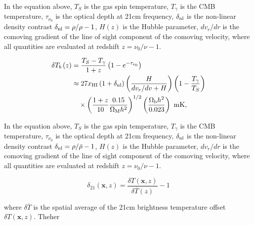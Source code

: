 
In the equation above, $T_S$ is the gas spin temperature, $T_{\gamma}$ is the
CMB temperature, $\tau_{\nu_0}$ is the optical depth at 21cm frequency, $\delta_{\rm nl}$
is the non-linear density contrast $\delta_{\rm nl} = \rho / \rho - 1$, $H \left( z \right)$
is the Hubble parameter, $dv_r / dr$ is the comoving gradient of the line of sight component
of the comoving velocity, where all quantities are evaluated at redshift $z = \nu_0 / \nu - 1$.


\begin{align}
  \delta T_b \left(z \right) & = \frac{T_S - T_{\gamma}}{1+z} \left(1 - e^{-\tau_{\nu_0}} \right ) \nonumber \\
      & \approx 27 x_{\rm HI} \left( 1 + \delta_{\rm nl} \right) \left( \frac{H}{dv_r/dv + H}\right) \left( 1 - \frac{T_{\gamma}}{T_S}\right) \nonumber \\
      & \hspace{1em} \times \left( \frac{1 + z}{10} \frac{0.15}{\Omega_{\rm M} h^2} \right)^{1/2} \left( \frac{\Omega_{\rm b} h^2}{0.023} \right) \textrm{ mK,}
\end{align}

In the equation above, $T_S$ is the gas spin temperature, $T_{\gamma}$ is the
CMB temperature, $\tau_{\nu_0}$ is the optical depth at 21cm frequency, $\delta_{\rm nl}$
is the non-linear density contrast $\delta_{\rm nl} = \rho / \bar{\rho} - 1$, $H \left( z \right)$
is the Hubble parameter, $dv_r / dr$ is the comoving gradient of the line of sight component
of the comoving velocity, where all quantities are evaluated at redshift $z = \nu_0 / \nu - 1$.

\begin{equation}
\delta_{21} \left( \mathbf{x}, z\right) = \frac{ \delta T \left( \mathbf{x}, z\right)}{\delta \overline{T} \left( z \right)} - 1
\end{equation}

where $\delta \overline{T}$ is the spatial average of the 21cm brightness temperature offset
$\delta T \left( \mathbf{x}, z\right)$. Theher
